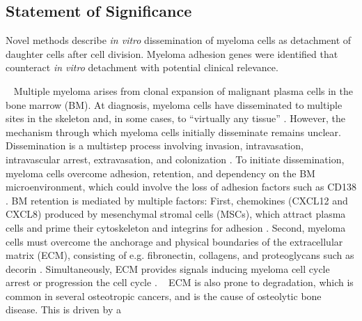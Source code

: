 \subsection*{Statement of Significance}
Novel methods describe \textit{in vitro} dissemination of myeloma cells as detachment of
daughter cells after cell division. Myeloma adhesion genes were identified that
counteract \textit{in vitro} detachment with potential clinical relevance.
\newpage


\label{C1:introduction} %
\ %
Multiple myeloma arises from clonal expansion of malignant plasma cells in the
bone marrow (BM). At diagnosis, myeloma cells have disseminated to multiple
sites in the skeleton and, in some cases, to “virtually any tissue”
\cite{bladeExtramedullaryDiseaseMultiple2022,rajkumarInternationalMyelomaWorking2014}.
However, the mechanism through which myeloma cells initially disseminate remains
unclear. Dissemination is a multistep process involving invasion, intravasation,
intravascular arrest, extravasation, and colonization
\cite{zeissigTumourDisseminationMultiple2020}. To initiate dissemination,
myeloma cells overcome adhesion, retention, and dependency on the BM
microenvironment, which could involve the loss of adhesion factors such as CD138
\cite{akhmetzyanovaDynamicCD138Surface2020,garcia-ortizRoleTumorMicroenvironment2021}.
BM retention is mediated by multiple factors: First, chemokines (CXCL12 and
CXCL8) produced by mesenchymal stromal cells (MSCs), which attract plasma cells
and prime their cytoskeleton and integrins for adhesion
\cite{aggarwalChemokinesMultipleMyeloma2006,alsayedMechanismsRegulationCXCR42007}.
Second, myeloma cells must overcome the anchorage and physical boundaries of the
extracellular matrix (ECM), consisting of e.g. fibronectin, collagens, and
proteoglycans such as decorin
\cite{huDecorinmediatedSuppressionTumorigenesis2021,
huangHigherDecorinLevels2015,katzAdhesionMoleculesLifelines2010,
kiblerAdhesiveInteractionsHuman1998}. Simultaneously, ECM provides signals
inducing myeloma cell cycle arrest or progression the cell cycle
\cite{huDecorinmediatedSuppressionTumorigenesis2021,katzAdhesionMoleculesLifelines2010}.
\ %
ECM is also prone to degradation, which is common in several osteotropic
cancers, and is the cause of osteolytic bone disease. This is driven by a
